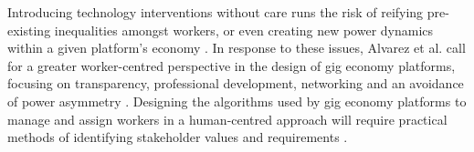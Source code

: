 Introducing technology interventions without care runs the risk of reifying pre-existing inequalities amongst workers, or even creating new power dynamics within a given platform's economy \cite{martin2016}. In response to these issues, Alvarez et al. call for a greater worker-centred perspective in the design of gig economy platforms, focusing on transparency, professional development, networking and an avoidance of power asymmetry \cite{carlos2021}. Designing the algorithms used by gig economy platforms to manage and assign workers in a human-centred approach will require practical methods of identifying stakeholder values and requirements \cite{lee2015}.